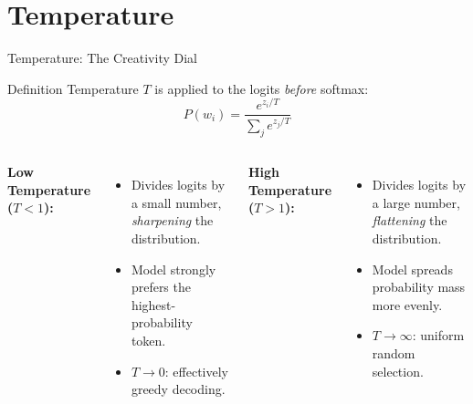 \documentclass{beamer}
\begin{document}
\section{Temperature}

\begin{frame}{Temperature: The Creativity Dial}
    \begin{block}{Definition}
        Temperature $T$ is applied to the logits \emph{before} softmax:
        \[
            P(w_i) = \frac{e^{z_i / T}}{\sum_j e^{z_j / T}}
        \]
    \end{block}

    \vspace{0.2cm}
    \begin{columns}
        \textbf{Low Temperature ($T < 1$):}
        \begin{itemize}
            \item Divides logits by a small number, \emph{sharpening} the distribution.
            \item Model strongly prefers the highest-probability token.
            \item $T \to 0$: effectively greedy decoding.
        \end{itemize}

        \textbf{High Temperature ($T > 1$):}
        \begin{itemize}
            \item Divides logits by a large number, \emph{flattening} the distribution.
            \item Model spreads probability mass more evenly.
            \item $T \to \infty$: uniform random selection.
        \end{itemize}
    \end{columns}
\end{frame}
\end{document}
